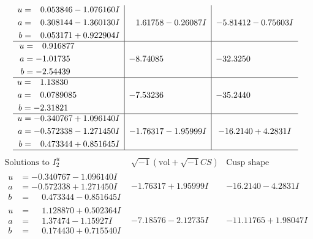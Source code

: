 \documentclass[1p]{elsarticle_modified}
\theoremstyle{definition}
\newcommand{\I}{\sqrt{-1}}
\begin{document}
$$\begin{array}{c|c|c}
\begin{aligned}
u &= \phantom{-}0.053846 - 1.076160 I \\
a &= \phantom{-}0.308144 - 1.360130 I \\
b &= \phantom{-}0.053171 + 0.922904 I\end{aligned}
 & \phantom{-}1.61758 - 0.26087 I & -5.81412 - 0.75603 I \\ \hline\begin{aligned}
u &= \phantom{-}0.916877\phantom{ +0.000000I} \\
a &= -1.01735\phantom{ +0.000000I} \\
b &= -2.54439\phantom{ +0.000000I}\end{aligned}
 & -8.74085\phantom{ +0.000000I} & -32.3250\phantom{ +0.000000I} \\ \hline\begin{aligned}
u &= \phantom{-}1.13830\phantom{ +0.000000I} \\
a &= \phantom{-}0.0789085\phantom{ +0.000000I} \\
b &= -2.31821\phantom{ +0.000000I}\end{aligned}
 & -7.53236\phantom{ +0.000000I} & -35.2440\phantom{ +0.000000I} \\ \hline\begin{aligned}
u &= -0.340767 + 1.096140 I \\
a &= -0.572338 - 1.271450 I \\
b &= \phantom{-}0.473344 + 0.851645 I\end{aligned}
 & -1.76317 - 1.95999 I & -16.2140 + 4.2831 I\\
 \hline 
 \end{array}$$\newpage$$\begin{array}{c|c|c}  
\text{Solutions to }I^u_{2}& \I (\text{vol} + \sqrt{-1}CS) & \text{Cusp shape}\\
 \hline 
\begin{aligned}
u &= -0.340767 - 1.096140 I \\
a &= -0.572338 + 1.271450 I \\
b &= \phantom{-}0.473344 - 0.851645 I\end{aligned}
 & -1.76317 + 1.95999 I & -16.2140 - 4.2831 I \\ \hline\begin{aligned}
u &= \phantom{-}1.128870 + 0.502364 I \\
a &= \phantom{-}1.37474 - 1.15927 I \\
b &= \phantom{-}0.174430 + 0.715540 I\end{aligned}
 & -7.18576 - 2.12735 I & -11.11765 + 1.98047 I \\ \hline\begin{aligned}

\end{aligned}
\end{array}$$
\end{document}
